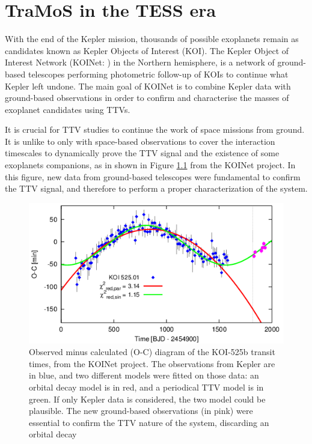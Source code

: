 \chapter{TraMoS in the TESS era}\label{chap:tess}

With the end of the Kepler mission, thousands of possible exoplanets remain as candidates known as Kepler Objects of Interest (KOI). The Kepler Object of Interest Network (KOINet: \citep{vonEssen2018,Freuddenthal2018}) in the Northern hemisphere, is a network of ground-based telescopes performing photometric follow-up of KOIs to continue what Kepler left undone. The main goal of KOINet is to combine Kepler data with ground-based observations in order to confirm and characterise the masses of exoplanet candidates using TTVs.

It is crucial for TTV studies to continue the work of space missions from ground. It is unlike to only with space-based observations to cover the interaction timescales to dynamically prove the TTV signal and the existence of some exoplanets companions, as in shown in Figure \ref{koinet} from the KOINet project. In this figure, new data from ground-based telescopes were fundamental to confirm the TTV signal, and therefore to perform a proper characterization of the system.

\begin{figure}
\centering
\includegraphics[width=0.8\columnwidth]{imagenes/koinet.png}
\caption{Observed minus calculated (O-C) diagram of the KOI-525b transit times, from the KOINet project. The observations from Kepler are in blue, and two different models were fitted on those data: an orbital decay model is in red, and a periodical TTV model is in green. If only Kepler data is considered, the two model could be plausible. The new ground-based observations (in pink) were essential to confirm the TTV nature of the system, discarding an orbital decay}
\label{koinet}
\end{figure}

